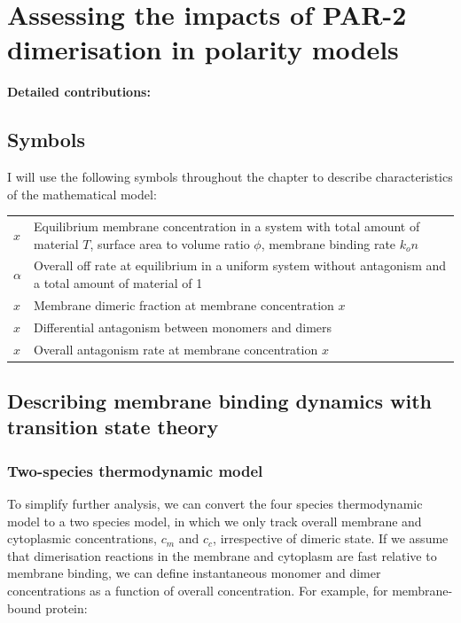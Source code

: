 \documentclass[12pt]{"report"}
\begin{document}
\clearpage
\chapter{Assessing the impacts of PAR-2 dimerisation in polarity models}

\textbf{Detailed contributions:}\\

\clearpage
\section*{Symbols}

I will use the following symbols throughout the chapter to describe characteristics of the mathematical model:\\

\begin{tabular}{ll}
$x$ & Equilibrium membrane concentration in a system with total amount of material $T$, surface area to volume ratio $\phi$, membrane binding rate $k_on$ \\
$\alpha$ & Overall off rate at equilibrium in a uniform system without antagonism and a total amount of material of 1 \\
$x$ & Membrane dimeric fraction at membrane concentration $x$ \\
$x$ & Differential antagonism between monomers and dimers \\
$x$ & Overall antagonism rate at membrane concentration $x$
\end{tabular}

\clearpage
\section{Describing membrane binding dynamics with transition state theory}

\subsection{Two-species thermodynamic model} 

To simplify further analysis, we can convert the four species thermodynamic model to a two species model, in which we only track overall membrane and cytoplasmic concentrations, $c_m$ and $c_c$, irrespective of dimeric state. If we assume that dimerisation reactions in the membrane and cytoplasm are fast relative to membrane binding, we can define instantaneous monomer and dimer concentrations as a function of overall concentration. For example, for membrane-bound protein:
\end{document}
